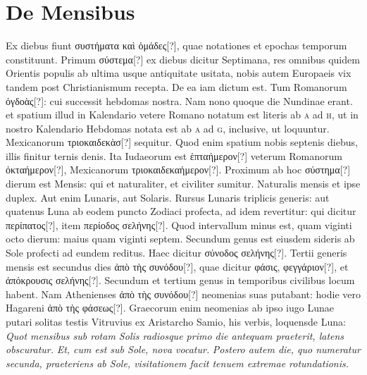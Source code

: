 \section{De Mensibus}
Ex diebus fiunt \textgreek{συστήματα καὶ ὁμάδες[?]},
 quae notationes et epochas
temporum constituunt.
Primum \textgreek{σύστεμα[?]} ex diebus dicitur Septimana,
res omnibus quidem Orientis populis ab ultima usque
antiquitate usitata,
 nobis autem Europaeis vix tandem post Christianismum
recepta.
De ea iam dictum est.
Tum Romanorum \textgreek{ὀγδοὰς[?]}: cui
successit hebdomas nostra.
Nam nono quoque die Nundinae erant.
et spatium illud in Kalendario vetere Romano notatum est literis ab
\textsc{a} ad \textsc{h}, ut in nostro Kalendario Hebdomas
 notata est ab \textsc{a} ad \textsc{g}, inclusive,
ut loquuntur.
Mexicanorum \textgreek{τριοκαιδεκὰσ[?]} sequitur.
Quod
enim spatium nobis septenis diebus, illis finitur ternis denis.
Ita Iudaeorum
est \textgreek{ἑπταήμερον[?]} veterum Romanorum \textgreek{ὀκταήμερον[?]},
 Mexicanorum
\textgreek{τριοκαιδεκαήμερον[?]}.
Proximum ab hoc \textgreek{σύστημα[?]} dierum est Mensis:
qui et naturaliter, et civiliter sumitur.
Naturalis mensis et ipse duplex.
Aut enim Lunaris, aut Solaris.
Rursus Lunaris triplicis generis:
aut quatenus Luna ab eodem puncto Zodiaci profecta, ad idem
revertitur: qui dicitur \textgreek{περίπατος[?]},
 item \textgreek{περίοδος σελήνης[?]}.
Quod intervallum
minus est, quam viginti octo dierum: maius quam viginti septem.
Secundum genus est eiusdem sideris ab Sole profecti ad eundem
reditus.
Haec dicitur \textgreek{σύνοδος σελήνης[?]}.
Tertii generis mensis est secundus
dies \textgreek{ἀπὸ τὴς συνόδου[?]},
 quae dicitur \textgreek{φάσις, φεγγάριον[?]},
 et \textgreek{ἀπόκρουσις σελήνης[?]}.
Secundum et tertium genus in temporibus civilibus locum habent.
Nam Athenienses \textgreek{ἀπὸ τὴς συνόδου[?]} neomenias suas putabant:
 hodie vero
Hagareni \textgreek{ἀπὸ τὴς φάσεως[?]}.
Graecorum enim neomenias ab ipso iugo
Lunae putari solitas testis Vitruvius ex Aristarcho Samio, his verbis,
loquensde Luna:
%
\textit{Quot mensibus sub rotam Solis radiosque primo die
antequam praeterit, latens obscuratur.}
 \textit{Et, cum est sub Sole, nova vocatur.}
\textit{Postero autem die, quo numeratur secunda,
 praeteriens ab Sole, visitationem
facit tenuem extremae rotundationis.}
